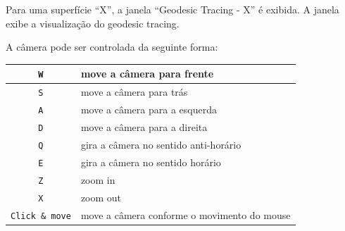 Para uma superfície ``X'', a janela ``Geodesic Tracing - X'' é exibida.
A janela exibe a visualização do geodesic tracing.

A câmera pode ser controlada da seguinte forma:

\begin{centering}
\begin{tabularx}{\textwidth}{||c|X||}
    \hline
    \texttt{W} & move a câmera para frente \\ 
    \hline
    \texttt{S} & move a câmera para trás \\
    \hline
    \texttt{A} & move a câmera para a esquerda \\
    \hline
    \texttt{D} & move a câmera para a direita \\
    \hline
    \texttt{Q} & gira a câmera no sentido anti-horário \\
    \hline
    \texttt{E} & gira a câmera no sentido horário \\
    \hline
    \texttt{Z} & zoom in \\
    \hline
    \texttt{X} & zoom out \\
    \hline
    \texttt{Click \& move} & move a câmera conforme o movimento do mouse \\
    \hline
\end{tabularx}
\end{centering}